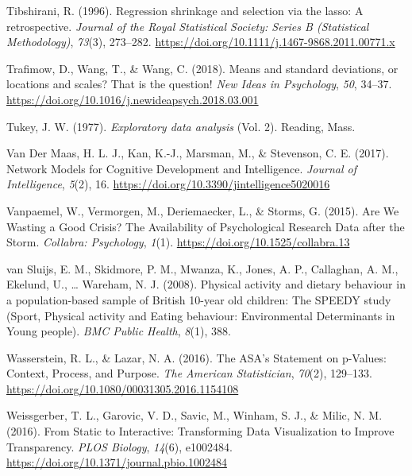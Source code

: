 \documentclass[british,man]{apa6}
\begin{document}
\leavevmode\hypertarget{ref-tibshiraniRegressionShrinkageSelection1996}{}%
Tibshirani, R. (1996). Regression shrinkage and selection via the lasso: A retrospective. \emph{Journal of the Royal Statistical Society: Series B (Statistical Methodology)}, \emph{73}(3), 273--282. \url{https://doi.org/10.1111/j.1467-9868.2011.00771.x}

\leavevmode\hypertarget{ref-trafimowMeansStandardDeviations2018}{}%
Trafimow, D., Wang, T., \& Wang, C. (2018). Means and standard deviations, or locations and scales? That is the question! \emph{New Ideas in Psychology}, \emph{50}, 34--37. \url{https://doi.org/10.1016/j.newideapsych.2018.03.001}

\leavevmode\hypertarget{ref-tukeyExploratoryDataAnalysis1977}{}%
Tukey, J. W. (1977). \emph{Exploratory data analysis} (Vol. 2). Reading, Mass.

\leavevmode\hypertarget{ref-vandermaasNetworkModelsCognitive2017a}{}%
Van Der Maas, H. L. J., Kan, K.-J., Marsman, M., \& Stevenson, C. E. (2017). Network Models for Cognitive Development and Intelligence. \emph{Journal of Intelligence}, \emph{5}(2), 16. \url{https://doi.org/10.3390/jintelligence5020016}

\leavevmode\hypertarget{ref-vanpaemelAreWeWasting2015}{}%
Vanpaemel, W., Vermorgen, M., Deriemaecker, L., \& Storms, G. (2015). Are We Wasting a Good Crisis? The Availability of Psychological Research Data after the Storm. \emph{Collabra: Psychology}, \emph{1}(1). \url{https://doi.org/10.1525/collabra.13}

\leavevmode\hypertarget{ref-vansluijsPhysicalActivityDietary2008}{}%
van Sluijs, E. M., Skidmore, P. M., Mwanza, K., Jones, A. P., Callaghan, A. M., Ekelund, U., \ldots{} Wareham, N. J. (2008). Physical activity and dietary behaviour in a population-based sample of British 10-year old children: The SPEEDY study (Sport, Physical activity and Eating behaviour: Environmental Determinants in Young people). \emph{BMC Public Health}, \emph{8}(1), 388.

\leavevmode\hypertarget{ref-wassersteinASAStatementPValues2016}{}%
Wasserstein, R. L., \& Lazar, N. A. (2016). The ASA's Statement on p-Values: Context, Process, and Purpose. \emph{The American Statistician}, \emph{70}(2), 129--133. \url{https://doi.org/10.1080/00031305.2016.1154108}

\leavevmode\hypertarget{ref-weissgerberStaticInteractiveTransforming2016}{}%
Weissgerber, T. L., Garovic, V. D., Savic, M., Winham, S. J., \& Milic, N. M. (2016). From Static to Interactive: Transforming Data Visualization to Improve Transparency. \emph{PLOS Biology}, \emph{14}(6), e1002484. \url{https://doi.org/10.1371/journal.pbio.1002484}
\end{document}
